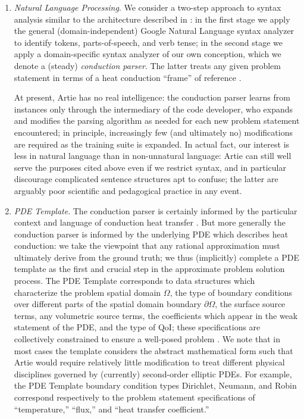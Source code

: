 \documentclass[preprint,12pt]{article}
\begin{document}
\begin{enumerate}
\item {\em Natural Language Processing}. We consider a two-step approach to syntax analysis similar to the architecture described in \cite{twopart_parser}: in the first stage we apply the general (domain-independent) Google Natural Language syntax analyzer \cite{Google_NLP} to identify tokens, parts-of-speech, and verb tense; in the second stage we apply a domain-specific syntax analyzer of our own conception, which we denote a (steady) {\em conduction parser}. The latter treats any given problem statement in terms of a heat conduction ``frame''  of reference \cite{frames1,frames}. 

At present, Artie has no real intelligence: the conduction parser learns from instances only through the intermediary of the code developer, who expands and modifies the parsing algorithm as needed for each new problem statement encountered; in principle, increasingly few (and ultimately no) modifications are required as the training suite is expanded. In actual fact, our interest is less in natural language than in non-unnatural language: Artie can still well serve the purposes cited above even if we restrict syntax, and in particular discourage complicated sentence structures apt to confuse; the latter are arguably poor scientific and pedagogical practice in any event.

\item {\em PDE Template}. The conduction parser is certainly informed by the particular context and language of conduction heat transfer \cite{Lienhard}. But more generally the conduction parser is informed by the underlying PDE which describes heat conduction: we take the viewpoint that any rational approximation must ultimately derive from the ground truth; we thus (implicitly) complete a PDE template as the first and crucial step in the approximate problem solution process. The PDE Template corresponds to data structures which characterize the problem spatial domain $\Omega$, the type of boundary conditions over different parts of the spatial domain boundary $\partial \Omega$, the surface source terms, any volumetric source terms, the coefficients which appear in the weak statement of the PDE, and the type of QoI; these specifications are collectively constrained to ensure a well-posed problem \cite{QandV}. We note that in most cases the template considers the abstract mathematical form such that Artie would require relatively little modification to treat different physical disciplines governed by (currently) second-order elliptic PDEs. For example, the PDE Template boundary condition types Dirichlet, Neumann, and Robin correspond respectively to the problem statement specifications of ``temperature,'' ``flux,'' and ``heat transfer coefficient.''


\end{enumerate}
\end{document}
